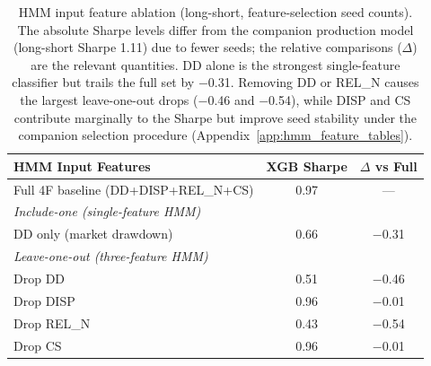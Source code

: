 \begin{table}[H]
\centering
\smallskip
\begin{tabular}{lcc}
\toprule
HMM Input Features & XGB Sharpe & $\Delta$ vs Full \\
\midrule
Full 4F baseline (DD+DISP+REL\_N+CS) & 0.97 & --- \\
\midrule
\multicolumn{3}{l}{\textit{Include-one (single-feature HMM)}} \\[2pt]
DD only (market drawdown)              & 0.66 & $-$0.31 \\
\midrule
\multicolumn{3}{l}{\textit{Leave-one-out (three-feature HMM)}} \\[2pt]
Drop DD                                & 0.51 & $-$0.46 \\
Drop DISP                              & 0.96 & $-$0.01 \\
Drop REL\_N                            & 0.43 & $-$0.54 \\
Drop CS                                & 0.96 & $-$0.01 \\
\bottomrule
\end{tabular}
\caption{HMM input feature ablation (long-short, feature-selection seed counts). The absolute Sharpe levels differ from the companion production model (long-short Sharpe 1.11) due to fewer seeds; the relative comparisons ($\Delta$) are the relevant quantities. DD alone is the strongest single-feature classifier but trails the full set by $-$0.31. Removing DD or REL\_N causes the largest leave-one-out drops ($-$0.46 and $-$0.54), while DISP and CS contribute marginally to the Sharpe but improve seed stability under the companion selection procedure (Appendix~\ref{app:hmm_feature_tables}).}
\label{tab:hmm_feature_ablation}
\end{table}

